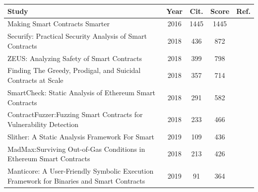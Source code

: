 \documentclass[a4paper,11pt]{article}
\begin{document}
\begin{table}[t]
        \begin{center}
            \small
            \begin{tabular}{||p{11cm}|c|c|c|c||}
                \hline
                Study & Year & Cit. & Score & Ref. \\ 
                \hline
                \hline
                Making Smart Contracts Smarter & 2016  & 1445 & 1445 & \cite{luu2016making} \\
                \hline
                Securify: Practical Security Analysis of Smart Contracts & 2018  & 436 & 872 & \cite{tsankov2018securify} \\
                \hline
                ZEUS: Analyzing Safety of Smart Contracts  & 2018  & 399 & 798 & \cite{kalra2018zeus} \\
                \hline
                Finding The Greedy, Prodigal, and Suicidal Contracts at Scale & 2018  & 357 & 714 & \cite{liu2018reguard} \\
                \hline
                SmartCheck: Static Analysis of Ethereum Smart Contracts & 2018  & 291 & 582 & \cite{tikhomirov2018smartcheck} \\
                \hline
                ContractFuzzer:Fuzzing Smart Contracts for Vulnerability Detection & 2018  & 233 & 466 & \cite{jiang2018contractfuzzer} \\
                \hline
                Slither: A Static Analysis Framework For Smart   & 2019  & 109 & 436 & \cite{feist2019slither} \\
                \hline
                MadMax:Surviving Out-of-Gas Conditions in Ethereum Smart Contracts & 2018  & 213 & 426 & \cite{grech2018madmax} \\
                \hline
                Manticore: A User-Friendly Symbolic Execution Framework for Binaries and Smart Contracts  & 2019  & 91 & 364 & \cite{mossberg2019manticore} \\
                \hline

\end{tabular}
\end{center}
\end{table}
\end{document}
